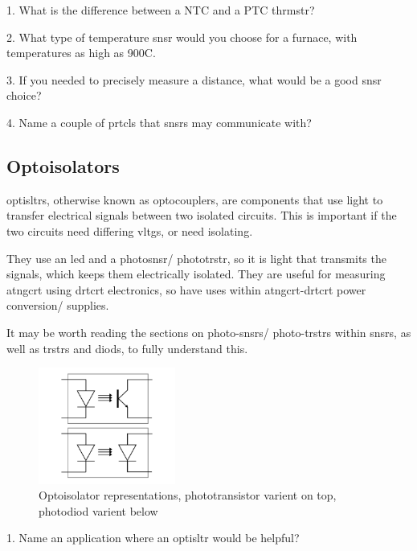 \documentclass[a4paper,11pt]{report}
\newcommand{\Quiz}[1] %
{
\par\noindent %
\phantomsection %
\todo[inline, color=blue!30]{\textbf{#1}} %
\vspace{1em} %
}
\begin{document}
\Quiz{Quiz}

1. What is the difference between a NTC and a PTC \gls{thrmstr}?

2. What type of temperature \gls{snsr} would you choose for a furnace, with temperatures as high as 900\degree C.

3. If you needed to precisely measure a distance, what would be a good \gls{snsr} choice?

4. Name a couple of \gls{prtcl}s that \gls{snsr}s may communicate with?

\vspace*{1\baselineskip}

\subsection{Optoisolators}

\gls{optisltr}s, otherwise known as optocouplers, are components that use light to transfer electrical signals between two isolated circuits. This is important if the two circuits need differing \gls{vltg}s, or need isolating.

They use an \gls{led} and a photo\gls{snsr}/ photo\gls{trstr}, so it is light that transmits the signals, which keeps them electrically isolated. They are useful for measuring \gls{atngcrt} using \gls{drtcrt} electronics, so have uses within \gls{atngcrt}-\gls{drtcrt} power conversion/ supplies.

It may be worth reading the sections on photo-\gls{snsr}s/ photo-\gls{trstr}s within \gls{snsr}s, as well as \gls{trstr}s and \gls{diod}s, to fully understand this.

\begin{figure}[H]
\centering
\includegraphics[width=0.4\textwidth]{optoisolator1}
\caption{Optoisolator representations, phototransistor varient on top, photo\gls{diod} varient below}
\end{figure}

\Quiz{Quiz}

1. Name an application where an \gls{optisltr} would be helpful?
\end{document}

